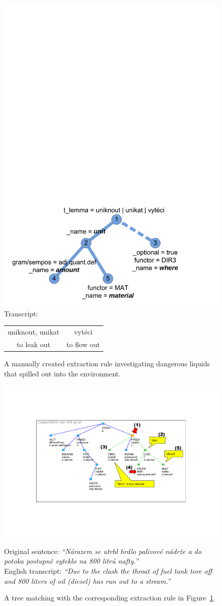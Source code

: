 \begin{figure}
	\centering
		\includegraphics[width=0.5\hsize]{eenv_extract_patern}
\\Transcript:\\
\begin{tabular}{|c|c|}
\hline
uniknout, unikat & vytéci\\
to leak out & to flow out\\
\hline
\end{tabular}		
	\caption{A manually created extraction rule investigating dangerous liquids that spilled out into the environment.}
	\label{fig:ch50_eenv_extract_patern}
\end{figure}


\begin{figure}
	\centering
		\includegraphics[angle=-90, width=0.6\hsize]{eenv_matching_tree}
		
Original sentence: 
\emph{``Nárazem se utrhl hrdlo palivové nádrže a do potoka postupně vyteklo na 800 litrů nafty.''}\\
English transcript: 
\emph{``Due to the clash the throat of fuel tank tore off and 800 liters of oil (diesel) has run out to a stream.''}
	\caption{A tree matching with the corresponding extraction rule in Figure~\ref{fig:ch50_eenv_extract_patern}.}
	\label{fig:ch50_eenv_matching_tree}
\end{figure}


